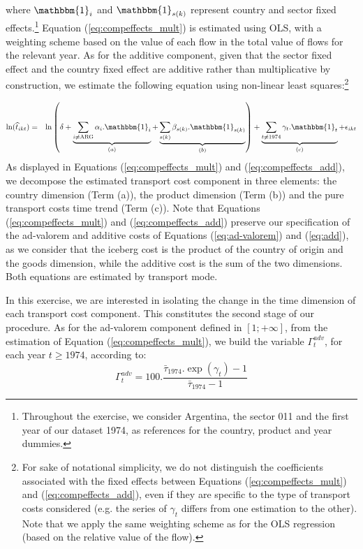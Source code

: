 \documentclass[a4paper,11pt]{article}
\begin{document}
\noindent where $\mathbbm{1}_i$ and $\mathbbm{1}_{s(k)}$ represent country and sector fixed effects.\footnote{Throughout the exercise, we consider Argentina, the sector 011 and the first year of our dataset 1974, as references for the country, product and year dummies.}  Equation (\ref{eq:compeffects_mult}) is estimated using OLS, with a weighting scheme based on the value of each flow in the total value of flows for the relevant year.
As for the additive component, given that the sector fixed effect and the country fixed effect are additive rather than multiplicative by construction, we estimate the following equation using non-linear least squares:\footnote{For sake of notational simplicity, we do not distinguish the coefficients associated with the fixed effects between Equations (\ref{eq:compeffects_mult}) and (\ref{eq:compeffects_add}), even if they are specific to the type of transport costs considered (e.g. the series of $\gamma_t$ differs from one estimation to the other).
Note that we apply the same weighting scheme as for the OLS regression (based on the relative value of the flow).}

\begin{eqnarray}
\ln(\widehat{t}_{ikt})&=&\ln\left( \delta + \underbrace{\sum_{i \neq \text{ARG}}  \alpha_i.\mathbbm{1}_i}_{(a)}+\underbrace{\sum_{s(k)}\beta_{s(k)}.\mathbbm{1}_{s(k)}}_{(b)}\right) + \underbrace{\sum_{t \neq 1974}\gamma_t.\mathbbm{1}_t}_{(c)}+\epsilon_{ikt} \label{eq:compeffects_add}
\end{eqnarray}
As displayed in Equations (\ref{eq:compeffects_mult}) and (\ref{eq:compeffects_add}), we decompose the estimated transport cost component in three elements: the country dimension (Term (a)), the product dimension (Term (b)) and the pure transport costs time trend (Term (c)).
Note that Equations (\ref{eq:compeffects_mult}) and (\ref{eq:compeffects_add}) preserve our specification of the ad-valorem and additive costs of Equations (\ref{eq:ad-valorem}) and (\ref{eq:add}), as we consider that the iceberg cost is the product of the country of origin and the goods dimension, while the additive cost is the sum of the two dimensions.
Both equations are estimated by transport mode.\smallskip

In this exercise, we are interested in isolating the change in the time dimension of each transport cost component.
This constitutes the second stage of our procedure.
As for the ad-valorem component defined in $[1;+\infty]$, from the estimation of Equation (\ref{eq:compeffects_mult}), we build the variable $\Gamma^{adv}_t$, for each year $t\geq 1974$, according to:
\begin{equation}
\Gamma^{adv}_t = 100.\frac {\bar{\tau}_{1974}.\exp(\gamma_t)-1} {\bar{\tau}_{1974}-1} \label{eq:comp_effects_adv}
\end{equation}
\end{document}
